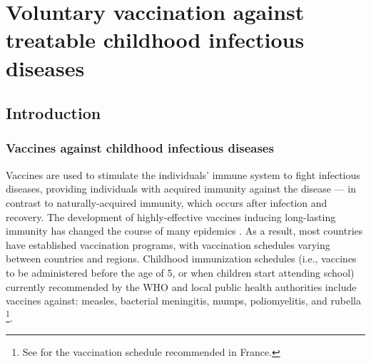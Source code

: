 \chapter{Voluntary vaccination against treatable childhood infectious diseases} 
\label{Vaccine}
\hypertarget{Vaccine}{}


\section{Introduction}
\label{Vaccine:Intro}
\subsection{Vaccines against childhood infectious diseases}
Vaccines are used to stimulate the individuals' immune system to fight infectious diseases, providing individuals with acquired immunity against the disease --- in contrast to naturally-acquired immunity, which occurs after infection and recovery. %
%
The development of highly-effective vaccines inducing long-lasting immunity has changed the course of many epidemics \cite[]{CDC_10achievements}. As a result, most countries have established vaccination programs, with vaccination schedules varying between countries and regions. Childhood immunization schedules (i.e., vaccines to be administered before the age of 5, or when children start attending school) currently recommended by the WHO and local public health authorities include vaccines against: measles, bacterial meningitis, mumps, poliomyelitis, and rubella \cite[]{CDC_PinkBook}\footnote{See \cite[]{CalendrierVaccinal2019} for the vaccination schedule recommended in France.}. 

